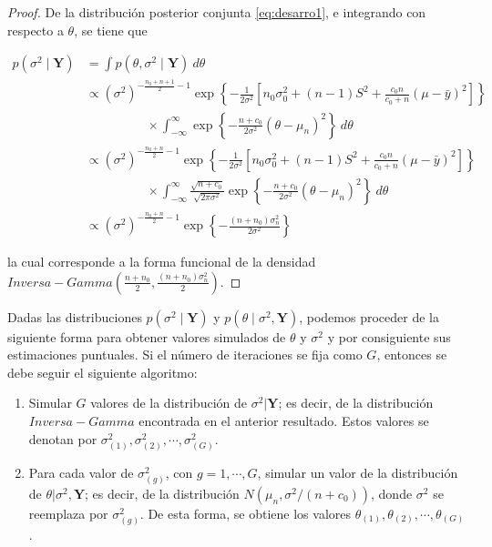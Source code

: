 \documentclass[
  10pt,
  spanish,
]{book}
\providecommand{\tightlist}{%
  \setlength{\itemsep}{0pt}\setlength{\parskip}{0pt}}
\theoremstyle{definition}
\theoremstyle{definition}
\theoremstyle{definition}
\theoremstyle{definition}
\theoremstyle{remark}
\begin{document}
\begin{proof}
{}De la distribución posterior conjunta \eqref{eq:desarro1}, e integrando con respecto a \(\theta\), se tiene que

\begin{align*}
p(\sigma^2 \mid \mathbf{Y})&=\int p(\theta,\sigma^2 \mid \mathbf{Y}) \ d\theta\\
&\propto (\sigma^2)^{-\frac{n_0+n+1}{2}-1}
\exp\left\{-\frac{1}{2\sigma^2}\left[n_0\sigma^2_0+(n-1)S^2+\frac{c_0n}{c_0+n}(\mu-\bar{y})^2\right]\right\}\\
&\hspace{2cm}\times
\int_{-\infty}^{\infty}\exp\left\{-\frac{n+c_0}{2\sigma^2}(\theta-\mu_n)^2\right\} \ d\theta\\
&\propto (\sigma^2)^{-\frac{n_0+n}{2}-1}
\exp\left\{-\frac{1}{2\sigma^2}\left[n_0\sigma^2_0+(n-1)S^2+\frac{c_0n}{c_0+n}(\mu-\bar{y})^2\right]\right\}\\
&\hspace{2cm}\times
\int_{-\infty}^{\infty}\frac{\sqrt{n+c_0}}{\sqrt{2\pi\sigma^2}}
\exp\left\{-\frac{n+c_0}{2\sigma^2}(\theta-\mu_n)^2\right\} \ d\theta\\
&\propto (\sigma^2)^{-\frac{n_0+n}{2}-1}
\exp\left\{-\frac{(n+n_0)\sigma^2_n}{2\sigma^2}\right\}
\end{align*}

la cual corresponde a la forma funcional de la densidad \(Inversa-Gamma(\frac{n+n_0}{2},\frac{(n+n_0)\sigma^2_n}{2})\).
\end{proof}

Dadas las distribuciones \(p(\sigma^2\mid \mathbf{Y})\) y \(p(\theta\mid \sigma^2, \mathbf{Y})\), podemos proceder de la siguiente forma para obtener valores simulados de \(\theta\) y \(\sigma^2\) y por consiguiente sus estimaciones puntuales. Si el número de iteraciones se fija como \(G\), entonces se debe seguir el siguiente algoritmo:

\begin{enumerate}
\def\labelenumi{\arabic{enumi}.}
\tightlist
\item
  Simular \(G\) valores de la distribución de \(\sigma^2|\mathbf{Y}\); es decir, de la distribución \(Inversa-Gamma\) encontrada en el anterior resultado. Estos valores se denotan por \(\sigma^2_{(1)},\sigma^2_{(2)},\cdots,\sigma^2_{(G)}\).
\item
  Para cada valor de \(\sigma^2_{(g)}\), con \(g=1,\cdots,G\), simular un valor de la distribución de \(\theta|\sigma^2,\mathbf{Y}\); es decir, de la distribución \(N(\mu_n,\sigma^2/(n+c_0))\), donde \(\sigma^2\) se reemplaza por \(\sigma^2_{(g)}\). De esta forma, se obtiene los valores \(\theta_{(1)},\theta_{(2)},\cdots,\theta_{(G)}\).
\end{enumerate}
\end{document}
